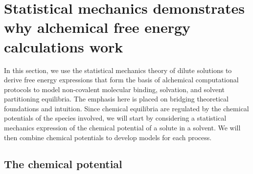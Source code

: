 \documentclass[9pt,bestpractices]{livecoms}
\begin{document}
\section{Statistical mechanics demonstrates why alchemical free energy calculations work}
\label{sec:theory}


In this section, we use the statistical mechanics theory of dilute solutions to derive free energy expressions that form the basis of alchemical computational protocols to model non-covalent molecular binding, solvation, and solvent partitioning equilibria. The emphasis here is placed on bridging theoretical foundations and intuition. Since chemical equilibria are regulated by the chemical potentials of the species involved, we will start by considering a statistical mechanics expression of the chemical potential of a solute in a solvent. We will then combine chemical potentials to develop models for each process.

\subsection{The chemical potential}
\end{document}
